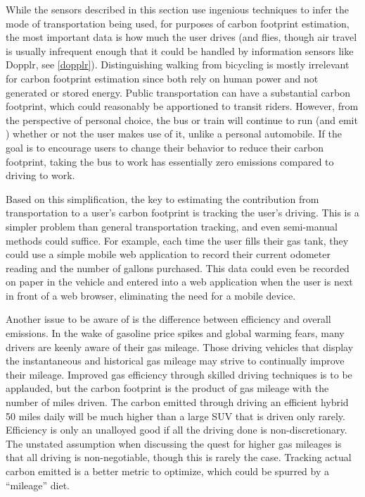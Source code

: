 While the sensors described in this section use ingenious techniques to infer the mode of transportation being used, for purposes of carbon footprint estimation, the most important data is how much the user drives (and flies, though air travel is usually infrequent enough that it could be handled by information sensors like Dopplr, see \autoref{dopplr}). Distinguishing walking from bicycling is mostly irrelevant for carbon footprint estimation since both rely on human power and not generated or stored energy. Public transportation can have a substantial carbon footprint, which could reasonably be apportioned to transit riders. However, from the perspective of personal choice, the bus or train will continue to run (and emit \COtwo) whether or not the user makes use of it, unlike a personal automobile. If the goal is to encourage users to change their behavior to reduce their carbon footprint, taking the bus to work has essentially zero emissions compared to driving to work.

Based on this simplification, the key to estimating the contribution from transportation to a user's carbon footprint is tracking the user's driving. This is a simpler problem than general transportation tracking, and even semi-manual methods could suffice. For example, each time the user fills their gas tank, they could use a simple mobile web application to record their current odometer reading and the number of gallons purchased. This data could even be recorded on paper in the vehicle and entered into a web application when the user is next in front of a web browser, eliminating the need for a mobile device.

Another issue to be aware of is the difference between efficiency and overall emissions. In the wake of gasoline price spikes and global warming fears, many drivers are keenly aware of their gas mileage. Those driving vehicles that display the instantaneous and historical gas mileage may strive to continually improve their mileage. Improved gas efficiency through skilled driving techniques is to be applauded, but the carbon footprint is the product of gas mileage with the number of miles driven. The carbon emitted through driving an efficient hybrid 50 miles daily will be much higher than a large SUV that is  driven only rarely. Efficiency is only an unalloyed good if all the driving done is non-discretionary. The unstated assumption when discussing the quest for higher gas mileages is that all driving is non-negotiable, though this is rarely the case. Tracking actual carbon emitted is a better metric to optimize, which could be spurred by a ``mileage'' diet.

